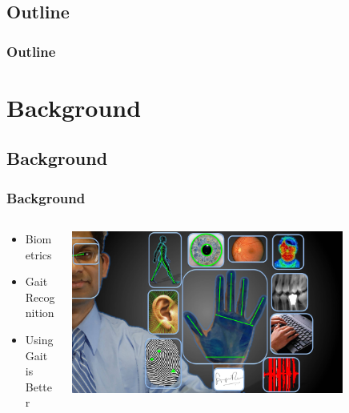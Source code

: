 \documentclass{beamer}
\begin{document}
\subsection*{Outline}

\begin{frame}
  \frametitle{Outline}
  \tableofcontents[hideallsubsections]
\end{frame}

\section[Mobile Security]{Background}

\subsection{Background}
\begin{frame}
  \frametitle{Background}

  \begin{columns}
  \begin{column}{0.4\textwidth}
  \begin{itemize}
    \item Biometrics 
  	\linebreak
  	\item Gait Recognition
  	\linebreak
	\item Using Gait is Better
  \end{itemize}
  \end{column}
  \begin{column}{0.8\textwidth}
   \includegraphics[width=0.8\textwidth]{Illustrations/allbiometrics.jpg}
  \end{column}
  \end{columns}
\end{frame}
\end{document}
